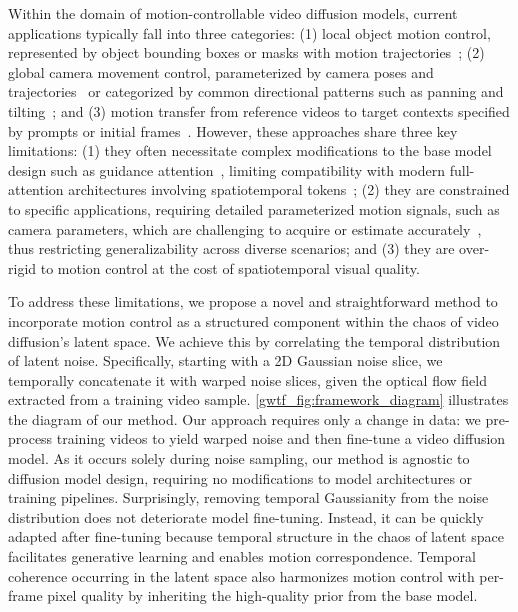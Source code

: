 Within the domain of motion-controllable video diffusion models, current applications typically fall into three categories: (1) local object motion control, represented by object bounding boxes or masks with motion trajectories~\cite{jain2024peekaboo,yang2024direct,wang2024motionctrl,shi2024motion,wu2024draganything,namekata2024sg,qiu2024freetraj,geng2024motion}; (2) global camera movement control, parameterized by camera poses and trajectories~\cite{yang2024direct,he2024cameractrl,kuang2024collaborative,wang2024motionctrl,xu2024camco,wu2024cat4d} or categorized by common directional patterns such as panning and tilting~\cite{guo2024animatediff,yang2024direct}; and (3) motion transfer from reference videos to target contexts specified by prompts or initial frames~\cite{wang2024videocomposer,yatim2024space,geyer2023tokenflow,yin2024scalable,ku2024anyv2v,ling2024motionclone,mou2024revideo,aira2024motioncraft}. However, these approaches share three key limitations: (1) they often necessitate complex modifications to the base model design such as guidance attention~\cite{qiu2024freetraj}, limiting compatibility with modern full-attention architectures involving spatiotemporal tokens~\cite{yang2024cogvideox}; (2) they are constrained to specific applications, requiring detailed parameterized motion signals, such as camera parameters, which are challenging to acquire or estimate accurately~\cite{zhang2024monst3r}, thus restricting generalizability across diverse scenarios; and (3) they are over-rigid to motion control at the cost of spatiotemporal visual quality.

To address these limitations, we propose a novel and straightforward method to incorporate motion control as a structured component within the chaos of video diffusion's latent space. We achieve this by correlating the temporal distribution of latent noise. Specifically, starting with a 2D Gaussian noise slice, we temporally concatenate it with warped noise slices, given the optical flow field~\cite{teed2020raft} extracted from a training video sample. \cref{gwtf_fig:framework_diagram} illustrates the diagram of our method. Our approach requires only a change in data: we pre-process training videos to yield warped noise and then fine-tune a video diffusion model. As it occurs solely during noise sampling, our method is agnostic to diffusion model design, requiring no modifications to model architectures or training pipelines. Surprisingly, removing temporal Gaussianity from the noise distribution does not deteriorate model fine-tuning. Instead, it can be quickly adapted after fine-tuning because temporal structure in the chaos of latent space facilitates generative learning and enables motion correspondence. Temporal coherence occurring in the latent space also harmonizes motion control with per-frame pixel quality by inheriting the high-quality prior from the base model.

